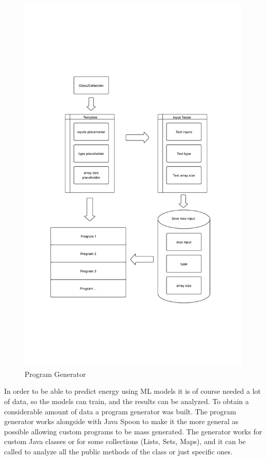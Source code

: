 \begin{figure}[H]
  \centering
  \includegraphics[width = 1 \textwidth]{figures/program_generator.pdf}
  \caption{Program Generator}
  \label{fig:program_generator}
\end{figure}

In order to be able to predict energy using ML models it is of course needed a lot of data, so the models can train, and the results can be analyzed. To obtain a considerable amount of data a program generator was built.
The program generator works alongside with Java Spoon to make it the more general as possible allowing custom programs to be mass generated.
The generator works for custom Java classes or for some collections (Lists, Sets, Maps), and it can be called to analyze all the public methods of the class or just specific ones.

